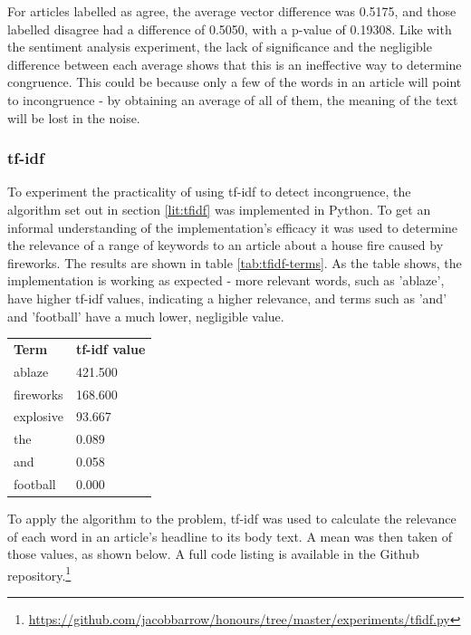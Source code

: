 For articles labelled as agree, the average vector difference was 0.5175, and those labelled disagree had a difference of 0.5050, with a p-value of 0.19308. Like with the sentiment analysis experiment, the lack of significance and the negligible difference between each average shows that this is an ineffective way to determine congruence. This could be because only a few of the words in an article will point to incongruence - by obtaining an average of all of them, the meaning of the text will be lost in the noise.

\subsubsection{tf-idf}

\begin{minipage}{0.65\linewidth}
To experiment the practicality of using tf-idf to detect incongruence, the algorithm set out in section \ref{lit:tfidf} was implemented in Python. To get an informal understanding of the implementation's efficacy it was used to determine the relevance of a range of keywords to an article about a house fire caused by fireworks. The results are shown in table \ref{tab:tfidf-terms}. As the table shows, the implementation is working as expected - more relevant words, such as 'ablaze', have higher tf-idf values, indicating a higher relevance, and terms such as 'and' and 'football' have a much lower, negligible value.
\\
\end{minipage}
\hspace{5mm}
\begin{minipage}{0.3\linewidth}
\vspace{-2mm}
\begin{tabular}{ll}
\textbf{Term} & \textbf{tf-idf value} \\
ablaze & 421.500 \\
fireworks & 168.600 \\
explosive & 93.667 \\
the & 0.089 \\
and & 0.058 \\
football & 0.000
\end{tabular}
\label{tab:tfidf-terms}
\end{minipage}

To apply the algorithm to the problem, tf-idf was used to calculate the relevance of each word in an article's headline to its body text. A mean was then taken of those values, as shown below. A full code listing is available in the Github repository.\footnote{\url{https://github.com/jacobbarrow/honours/tree/master/experiments/tfidf.py}}

